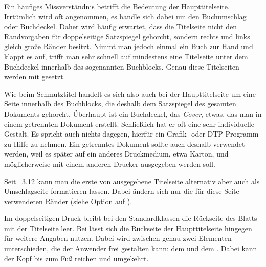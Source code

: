 \begin{Explain}
  Ein häufiges Missverständnis betrifft die Bedeutung der
  Haupttitelseite. Irrtümlich wird oft angenommen, es handle sich dabei um den
  Buchumschlag oder Buchdeckel. Daher wird
  häufig erwartet, dass die Titelseite nicht den Randvorgaben für
  doppelseitige Satzspiegel gehorcht, sondern rechts und links gleich große
  Ränder besitzt. Nimmt man jedoch einmal ein Buch zur Hand und klappt es auf,
  trifft man sehr schnell auf mindestens eine Titelseite
  unter dem Buchdeckel innerhalb des sogenannten Buchblocks. Genau diese
  Titelseiten werden mit  gesetzt.

  Wie beim Schmutztitel handelt es sich also auch bei der Haupttitelseite um
  eine Seite innerhalb des Buchblocks, die deshalb dem Satzspiegel des
  gesamten Dokuments gehorcht. Überhaupt ist ein Buchdeckel, das \emph{Cover},
  etwas, das man in einem getrennten Dokument erstellt. Schließlich hat er oft
  eine sehr individuelle Gestalt. Es spricht auch nichts dagegen, hierfür ein
  Grafik- oder DTP-Programm zu Hilfe zu nehmen. Ein getrenntes Dokument sollte
  auch deshalb verwendet werden, weil es später auf ein anderes Druckmedium,
  etwa Karton, und möglicherweise mit einem anderen Drucker ausgegeben werden
  soll.

  Seit \KOMAScript~3.12 kann man die erste von
   ausgegebene Titelseite
  alternativ aber auch als Umschlagseite formatieren lassen. Dabei ändern sich
  nur die für diese Seite verwendeten Ränder (siehe Option
   auf
  ).
\end{Explain}
%
\EndIndexGroup


\begin{Declaration}
\end{Declaration}%
Im doppelseitigen Druck bleibt bei
den Standardklassen die Rückseite des Blatts mit der Titelseite leer. Bei
{\KOMAScript} lässt sich die Rückseite der Haupttitelseite hingegen für
weitere Angaben nutzen. Dabei wird zwischen genau zwei Elementen
unterschieden, die der Anwender frei gestalten kann: dem
 und dem
. Dabei kann der Kopf bis zum Fuß reichen und
umgekehrt. %
%
\EndIndexGroup



